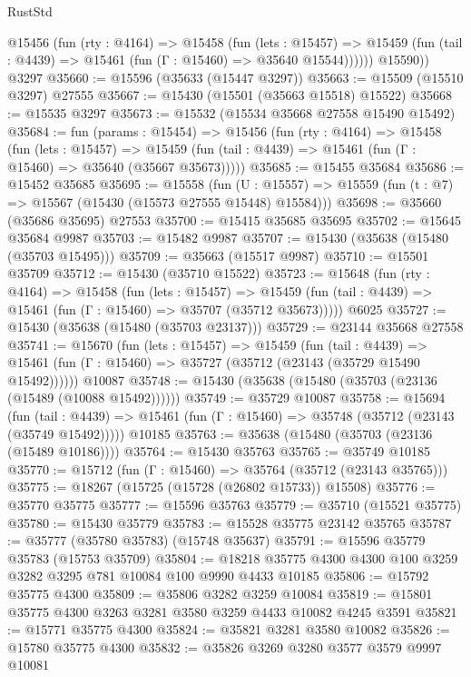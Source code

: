\begin{lexlean}{RustStd}
\begin{coremodule}
          @15456
            (fun (rty : @4164) =>
            @15458
              (fun (lets : @15457) =>
              @15459 (fun (tail : @4439) => @15461 (fun (Γ : @15460) => @35640 @15544))))))
        @15590))
    @3297
@35660 := @15596 (@35633 (@15447 @3297))
@35663 := @15509 (@15510 @3297) @27555
@35667 := @15430 (@15501 (@35663 @15518) @15522)
@35668 := @15535 @3297
@35673 := @15532 (@15534 @35668 @27558 @15490 @15492)
@35684 := fun (params : @15454) =>
  @15456
    (fun (rty : @4164) =>
    @15458
      (fun (lets : @15457) =>
      @15459 (fun (tail : @4439) => @15461 (fun (Γ : @15460) => @35640 (@35667 @35673)))))
@35685 := @15455 @35684
@35686 := @15452 @35685
@35695 := @15558
    (fun (U : @15557) => @15559 (fun (t : @7) => @15567 (@15430 (@15573 @27555 @15448) @15584)))
@35698 := @35660 (@35686 @35695) @27553
@35700 := @15415 @35685 @35695
@35702 := @15645 @35684 @9987
@35703 := @15482 @9987
@35707 := @15430 (@35638 (@15480 (@35703 @15495)))
@35709 := @35663 (@15517 @9987)
@35710 := @15501 @35709
@35712 := @15430 (@35710 @15522)
@35723 := @15648
    (fun (rty : @4164) =>
    @15458
      (fun (lets : @15457) =>
      @15459 (fun (tail : @4439) => @15461 (fun (Γ : @15460) => @35707 (@35712 @35673)))))
    @6025
@35727 := @15430 (@35638 (@15480 (@35703 @23137)))
@35729 := @23144 @35668 @27558
@35741 := @15670
    (fun (lets : @15457) =>
    @15459
      (fun (tail : @4439) =>
      @15461 (fun (Γ : @15460) => @35727 (@35712 (@23143 (@35729 @15490 @15492))))))
    @10087
@35748 := @15430 (@35638 (@15480 (@35703 (@23136 (@15489 (@10088 @15492))))))
@35749 := @35729 @10087
@35758 := @15694
    (fun (tail : @4439) => @15461 (fun (Γ : @15460) => @35748 (@35712 (@23143 (@35749 @15492)))))
    @10185
@35763 := @35638 (@15480 (@35703 (@23136 (@15489 @10186))))
@35764 := @15430 @35763
@35765 := @35749 @10185
@35770 := @15712 (fun (Γ : @15460) => @35764 (@35712 (@23143 @35765)))
@35775 := @18267 (@15725 (@15728 (@26802 @15733)) @15508)
@35776 := @35770 @35775
@35777 := @15596 @35763
@35779 := @35710 (@15521 @35775)
@35780 := @15430 @35779
@35783 := @15528 @35775 @23142 @35765
@35787 := @35777 (@35780 @35783) (@15748 @35637)
@35791 := @15596 @35779 @35783 (@15753 @35709)
@35804 := @18218 @35775 @4300 @4300 @100 @3259 @3282 @3295 @781 @10084 @100 @9990 @4433 @10185
@35806 := @15792 @35775 @4300
@35809 := @35806 @3282 @3259 @10084
@35819 := @15801 @35775 @4300 @3263 @3281 @3580 @3259 @4433 @10082 @4245 @3591
@35821 := @15771 @35775 @4300
@35824 := @35821 @3281 @3580 @10082
@35826 := @15780 @35775 @4300
@35832 := @35826 @3269 @3280 @3577 @3579 @9997 @10081

\end{coremodule}
\end{lexlean}
